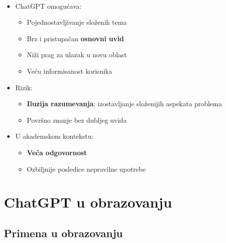 \documentclass{beamer}
\newcommand{\frametitlesection}{
    \raggedright
    \insertsubsectionhead\\[-2pt]
    {\small \insertsectionhead}
}
\begin{document}
\begin{frame}{\frametitlesection}
\begin{itemize}
    \item ChatGPT omogućava:
    \begin{itemize}
        \item Pojednostavljivanje složenih tema
        \item Brz i pristupačan \textbf{osnovni uvid}
        \item Niži prag za ulazak u novu oblast
        \item Veću informisanost korisnika
    \end{itemize}
    \item Rizik:
    \begin{itemize}
        \item \textbf{Iluzija razumevanja}: izostavljanje složenijih aspekata problema
        \item Površno znanje bez dubljeg uvida
    \end{itemize}
    \item U akademskom kontekstu:
    \begin{itemize}
        \item \textbf{Veća odgovornost}
        \item Ozbiljnije posledice nepravilne upotrebe 
    \end{itemize}
\end{itemize}
\end{frame}

\section{ChatGPT u obrazovanju}

\subsection{Primena u obrazovanju}
\end{document}
